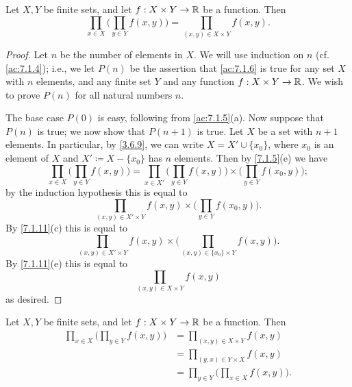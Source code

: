 \begin{ac}\label{ac:7.1.6}
  Let \(X, Y\) be finite sets, and let \(f : X \times Y \to \mathbb{R}\) be a function.
  Then
  \[
    \prod_{x \in X} \bigg(\prod_{y \in Y} f(x, y)\bigg) = \prod_{(x, y) \in X \times Y} f(x, y).
  \]
\end{ac}

\begin{proof}
  Let \(n\) be the number of elements in \(X\).
  We will use induction on \(n\) (cf. \cref{ac:7.1.4});
  i.e., we let \(P(n)\) be the assertion that \cref{ac:7.1.6} is true for any set \(X\) with \(n\) elements, and any finite set \(Y\) and any function \(f : X \times Y \to \mathbb{R}\).
  We wish to prove \(P(n)\) for all natural numbers \(n\).

  The base case \(P(0)\) is easy, following from \cref{ac:7.1.5}(a).
  Now suppose that \(P(n)\) is true;
  we now show that \(P(n + 1)\) is true.
  Let \(X\) be a set with \(n + 1\) elements.
  In particular, by \cref{3.6.9}, we can write \(X = X' \cup \{x_0\}\), where \(x_0\) is an element of \(X\) and \(X' \coloneqq X - \{x_0\}\) has \(n\) elements.
  Then by \cref{7.1.5}(e) we have
  \[
    \prod_{x \in X} \bigg(\prod_{y \in Y} f(x, y)\bigg) = \prod_{x \in X'} \bigg(\prod_{y \in Y} f(x, y)\bigg) \times \bigg(\prod_{y \in Y} f(x_0, y)\bigg);
  \]
  by the induction hypothesis this is equal to
  \[
    \prod_{(x, y) \in X' \times Y} f(x, y) \times \bigg(\prod_{y \in Y} f(x_0, y)\bigg).
  \]
  By \cref{7.1.11}(c) this is equal to
  \[
    \prod_{(x, y) \in X' \times Y} f(x, y) \times \bigg(\prod_{(x, y) \in \{x_0\} \times Y} f(x, y)\bigg).
  \]
  By \cref{7.1.11}(e) this is equal to
  \[
    \prod_{(x, y) \in X \times Y} f(x, y)
  \]
  as desired.
\end{proof}

\begin{ac}\label{ac:7.1.7}
  Let \(X, Y\) be finite sets, and let \(f : X \times Y \to \mathbb{R}\) be a function.
  Then
  \begin{align*}
    \prod_{x \in X} \bigg(\prod_{y \in Y} f(x, y)\bigg) & = \prod_{(x, y) \in X \times Y} f(x, y)                \\
                                                        & = \prod_{(y, x) \in Y \times X} f(x, y)                \\
                                                        & = \prod_{y \in Y} \bigg(\prod_{x \in X} f(x, y)\bigg).
  \end{align*}
\end{ac}

